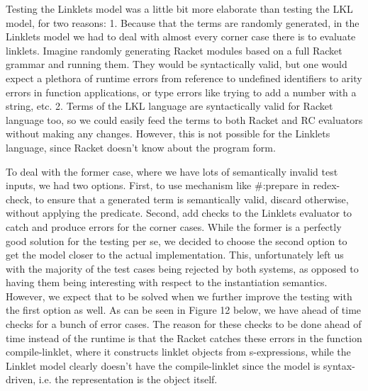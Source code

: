 			\begin{paragraph-here}%
				Testing the Linklets model was a little bit more elaborate than testing the LKL model, for two reasons: 1. Because that the terms are randomly generated, in the Linklets model we had to deal with almost every corner case there is to evaluate linklets. Imagine randomly generating Racket modules based on a full Racket grammar and running them. They would be syntactically valid, but one would expect a plethora of runtime errors from reference to undefined identifiers to arity errors in function applications, or type errors like trying to add a number with a string, etc. 2. Terms of the LKL language are syntactically valid for Racket language too, so we could easily feed the terms to both Racket and RC evaluators without making any changes. However, this is not possible for the Linklets language, since Racket doesn’t know about the program form.
			\end{paragraph-here}


			\begin{paragraph-here}%
				To deal with the former case, where we have lots of semantically invalid test inputs, we had two options. First, to use mechanism like \#:prepare in redex-check, to ensure that a generated term is semantically valid, discard otherwise, without applying the predicate. Second, add checks to the Linklets evaluator to catch and produce errors for the corner cases. While the former is a perfectly good solution for the testing per se, we decided to choose the second option to get the model closer to the actual implementation. This, unfortunately left us with the majority of the test cases being rejected by both systems, as opposed to having them being interesting with respect to the instantiation semantics. However, we expect that to be solved when we further improve the testing with the first option as well. As can be seen in Figure 12 below, we have ahead of time checks for a bunch of error cases. The reason for these checks to be done ahead of time instead of the runtime is that the Racket catches these errors in the function compile-linklet, where it constructs linklet objects from s-expressions, while the Linklet model clearly doesn’t have the compile-linklet since the model is syntax-driven, i.e. the representation is the object itself.
			\end{paragraph-here}

